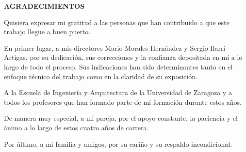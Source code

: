 \begin{center}
{\Large \bfseries AGRADECIMIENTOS}
\vspace{2.5cm}
\end{center}


Quisiera expresar mi gratitud a las personas que han contribuido a que este trabajo llegue a buen puerto.

En primer lugar, a mis directores Mario Morales Hernández y Sergio Ilarri Artigas, por su dedicación, sus correcciones y la confianza depositada en mí a lo largo de todo el proceso. Sus indicaciones han sido determinantes tanto en el enfoque técnico del trabajo como en la claridad de su exposición.

A la Escuela de Ingeniería y Arquitectura de la Universidad de Zaragoza y a todos los profesores que han formado parte de mi formación durante estos años.

De manera muy especial, a mi pareja, por el apoyo constante, la paciencia y el ánimo a lo largo de estos cuatro años de carrera.

Por último, a mi familia y amigos, por su cariño y su respaldo incondicional.
